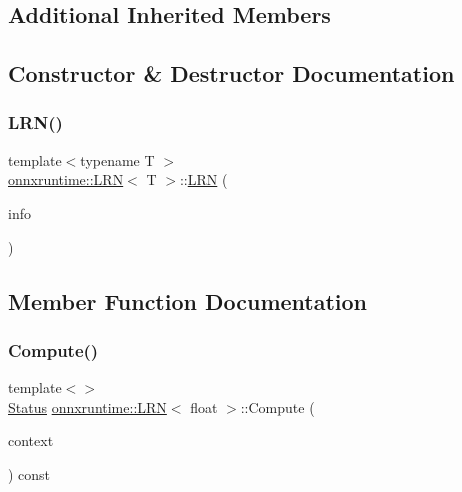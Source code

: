 \subsection*{Additional Inherited Members}


\subsection{Constructor \& Destructor Documentation}
\mbox{\label{classonnxruntime_1_1LRN_aafd00073623f8b5491667abd25b81ae7}} 
\subsubsection{\texorpdfstring{L\+R\+N()}{LRN()}}
{\footnotesize\ttfamily template$<$typename T $>$ \\
\mbox{\hyperlink{classonnxruntime_1_1LRN}{onnxruntime\+::\+L\+RN}}$<$ T $>$\+::\mbox{\hyperlink{classonnxruntime_1_1LRN}{L\+RN}} (\begin{DoxyParamCaption}\item[{const \mbox{\hyperlink{classonnxruntime_1_1OpKernelInfo}{Op\+Kernel\+Info}} \&}]{info }\end{DoxyParamCaption})\hspace{0.3cm}{\ttfamily [inline]}}



\subsection{Member Function Documentation}
\mbox{\label{classonnxruntime_1_1LRN_a1d387326090789f94aa5ddba6432a8a4}} 
\subsubsection{\texorpdfstring{Compute()}{Compute()}\hspace{0.1cm}{\footnotesize\ttfamily [1/2]}}
{\footnotesize\ttfamily template$<$$>$ \\
\mbox{\hyperlink{classonnxruntime_1_1common_1_1Status}{Status}} \mbox{\hyperlink{classonnxruntime_1_1LRN}{onnxruntime\+::\+L\+RN}}$<$ float $>$\+::Compute (\begin{DoxyParamCaption}\item[{\mbox{\hyperlink{classonnxruntime_1_1OpKernelContext}{Op\+Kernel\+Context}} $\ast$}]{context }\end{DoxyParamCaption}) const\hspace{0.3cm}{\ttfamily [virtual]}}




